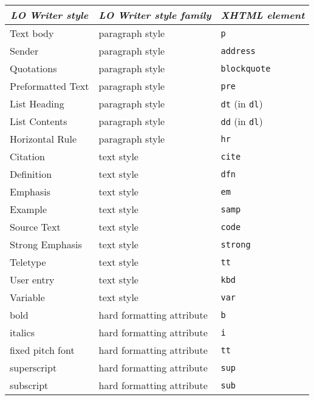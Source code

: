 \documentclass{article}
\newcommand\textstyleSourceText[1]{\texttt{\textmd{#1}}}
\begin{document}
\begin{flushleft}
\begin{tabular}{|l|l|l|}
\hline
\multicolumn{1}{|c|}{\bfseries\itshape LO Writer style} & \multicolumn{1}{c|}{\bfseries\itshape LO Writer style family} & \multicolumn{1}{c|}{\bfseries\itshape XHTML element}\\\hline
\mdseries Text body & \mdseries paragraph style & \mdseries \textstyleSourceText{p}\\\hline
\mdseries Sender & \mdseries paragraph style & \mdseries \textstyleSourceText{address}\\\hline
\mdseries Quotations & \mdseries paragraph style & \mdseries \textstyleSourceText{blockquote}\\\hline
\mdseries Preformatted Text & \mdseries paragraph style & \mdseries \textstyleSourceText{pre}\\\hline
\mdseries List Heading & \mdseries paragraph style & \mdseries \textstyleSourceText{dt} (in \textstyleSourceText{dl})\\\hline
\mdseries List Contents & \mdseries paragraph style & \mdseries \textstyleSourceText{dd} (in \textstyleSourceText{dl})\\\hline
\mdseries Horizontal Rule & \mdseries paragraph style & \mdseries \textstyleSourceText{hr}\\\hline
\mdseries Citation & \mdseries text style & \mdseries \textstyleSourceText{cite}\\\hline
\mdseries Definition & \mdseries text style & \mdseries \textstyleSourceText{dfn}\\\hline
\mdseries Emphasis & \mdseries text style & \mdseries \textstyleSourceText{em}\\\hline
\mdseries Example & \mdseries text style & \mdseries \textstyleSourceText{samp}\\\hline
\mdseries Source Text & \mdseries text style & \mdseries \textstyleSourceText{code}\\\hline
\mdseries Strong Emphasis & \mdseries text style & \mdseries \textstyleSourceText{strong}\\\hline
\mdseries Teletype & \mdseries text style & \mdseries \textstyleSourceText{tt}\\\hline
\mdseries User entry & \mdseries text style & \mdseries \textstyleSourceText{kbd}\\\hline
\mdseries Variable & \mdseries text style & \mdseries \textstyleSourceText{var}\\\hline
\mdseries bold & \mdseries hard formatting attribute & \mdseries \textstyleSourceText{b}\\\hline
\mdseries italics & \mdseries hard formatting attribute & \mdseries \textstyleSourceText{i}\\\hline
\mdseries fixed pitch font & \mdseries hard formatting attribute & \mdseries \textstyleSourceText{tt}\\\hline
\mdseries superscript & \mdseries hard formatting attribute & \mdseries \textstyleSourceText{sup}\\\hline
\mdseries subscript & \mdseries hard formatting attribute & \mdseries \textstyleSourceText{sub}\\\hline
\end{tabular}
\end{flushleft}
\end{document}
